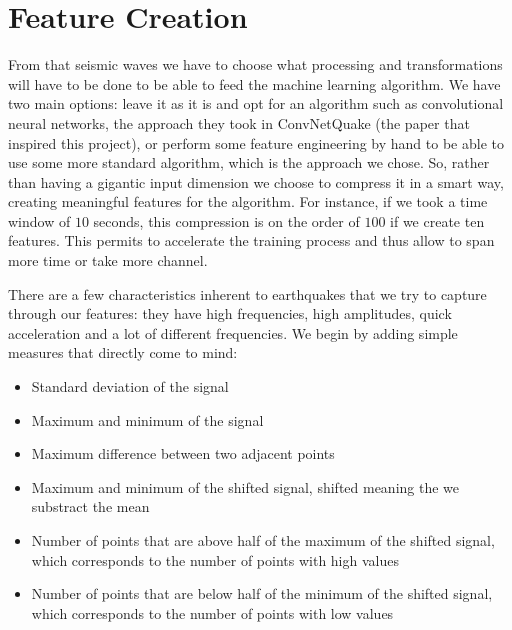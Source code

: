 \documentclass[10pt,conference,compsocconf]{IEEEtran}
\begin{document}
\section{Feature Creation}
From that seismic waves we have to choose what processing and transformations will have to be done to be able to feed the machine learning algorithm. We have two main options: leave it as it is and opt for an algorithm such as convolutional neural networks, the approach they took in ConvNetQuake (the paper \cite{ConvNetPaper} that inspired this project), or perform some feature engineering by hand to be able to use some more standard algorithm, which is the approach we chose. So, rather than having a gigantic input dimension we choose to compress it in a smart way, creating meaningful features for the algorithm. For instance, if we took a time window of $10$ seconds, this compression is on the order of $100$ if we create ten features. This permits to accelerate the training process and thus allow to span more time or take more channel.\newline

There are a few characteristics inherent to earthquakes that we try to capture through our features: they have high frequencies, high amplitudes, quick acceleration and a lot of different frequencies. We begin by adding simple measures that directly come to mind:\newline
\begin{itemize}
	\item{Standard deviation of the signal}
	\item{Maximum and minimum of the signal}
	\item{Maximum difference between two adjacent points}
	\item{Maximum and minimum of the shifted signal, shifted meaning the we substract the mean}
	\item{Number of points that are above half of the maximum of the shifted signal, which corresponds to the number of points with high values}
	\item{Number of points that are below half of the minimum of the shifted signal, which corresponds to the number of points with low values}
\end{itemize}
\end{document}
